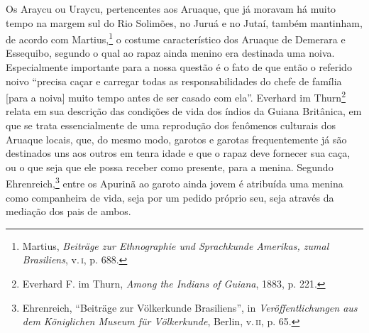 Os Araycu ou Uraycu, pertencentes aos Aruaque, que já moravam há muito
tempo na margem sul do Rio Solimões, no Juruá e no Jutaí, também
mantinham, de acordo com Martius,\footnote{Martius, \emph{Beiträge zur
  Ethnographie und Sprachkunde Amerikas, zumal Brasiliens}, v.\,\textsc{i}, p.
  688.} o costume característico dos Aruaque de Demerara e Essequibo,
segundo o qual ao rapaz ainda menino era destinada uma noiva.
Especialmente importante para a nossa questão é o fato de que então o
referido noivo ``precisa caçar e carregar todas as responsabilidades do
chefe de família {[}para a noiva{]} muito tempo antes de ser casado com
ela''. Everhard im Thurn\footnote{Everhard F. im Thurn, \emph{Among the
  Indians of Guiana}, 1883, p. 221.} relata em sua descrição das
condições de vida dos índios da Guiana Britânica, em que se trata
essencialmente de uma reprodução dos fenômenos culturais dos Aruaque
locais, que, do mesmo modo, garotos e garotas frequentemente já são
destinados uns aos outros em tenra idade e que o rapaz deve fornecer sua
caça, ou o que seja que ele possa receber como presente, para a menina.
Segundo Ehrenreich,\footnote{Ehrenreich, ``Beiträge zur Völkerkunde
  Brasiliens'', in \emph{Veröffentlichungen aus dem Königlichen Museum
  für Völkerkunde}, Berlin, v.\,\textsc{ii}, p. 65.} entre os Apurinã ao garoto
ainda jovem é atribuída uma menina como companheira de vida, seja por um
pedido próprio seu, seja através da mediação dos pais de ambos.


